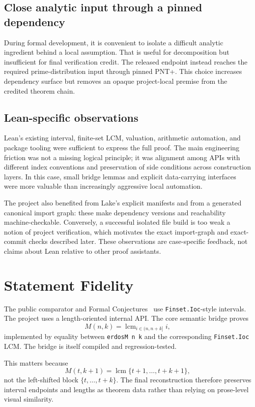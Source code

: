 \documentclass[sigplan,10pt,anonymous,review]{acmart}
\newcommand{\code}[1]{\texttt{#1}}
\newcommand{\M}{M}
\begin{document}
\subsection{Close analytic input through a pinned dependency}
During formal development, it is convenient to isolate a difficult analytic ingredient behind a local assumption. That is useful for decomposition but insufficient for final verification credit. The released endpoint instead reaches the required prime-distribution input through pinned PNT+. This choice increases dependency surface but removes an opaque project-local premise from the credited theorem chain.

\subsection{Lean-specific observations}
Lean's existing interval, finite-set LCM, valuation, arithmetic automation, and package tooling were sufficient to express the full proof. The main engineering friction was not a missing logical principle; it was alignment among APIs with different index conventions and preservation of side conditions across construction layers. In this case, small bridge lemmas and explicit data-carrying interfaces were more valuable than increasingly aggressive local automation.

The project also benefited from Lake's explicit manifests and from a generated canonical import graph: these make dependency versions and reachability machine-checkable. Conversely, a successful isolated file build is too weak a notion of project verification, which motivates the exact import-graph and exact-commit checks described later. These observations are case-specific feedback, not claims about Lean relative to other proof assistants.

\section{Statement Fidelity}
The public comparator and Formal Conjectures~\cite{formalconjectures678} use \code{Finset.Ioc}-style intervals. The project uses a length-oriented internal API. The core semantic bridge proves
\[
  \M(n,k)=\operatorname{lcm}_{i\in(n,n+k]} i,
\]
implemented by equality between \code{erdosM n k} and the corresponding \code{Finset.Ioc} LCM. The bridge is itself compiled and regression-tested.

This matters because
\[
  \M(t,k+1)=\operatorname{lcm}\{t+1,\ldots,t+k+1\},
\]
not the left-shifted block $\{t,\ldots,t+k\}$. The final reconstruction therefore preserves interval endpoints and lengths as theorem data rather than relying on prose-level visual similarity.
\end{document}
